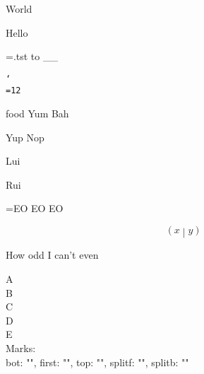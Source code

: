 \documentclass{article}
\begin{document}
\protected{}
\def\bar{World}
\edef\sayit{\foo\bar}
\def\foo{Dumm}
\def\bar{gelaufen}
\sayit

\detokenize{\hola}

\def\foo{Hello}
\def\bar{World}
\edef\sayit{\foo\unexpanded{\bar}}
\def\foo{Dumm}
\def\bar{gelaufen}
\sayit

\newread\file
\openin\file=\jobname.tst
\loop\unless\ifeof\file
    \readline\file to\fileline
    \_\fileline\_
\repeat
\closein\file

\def\test#1{\begingroup\tt\catcode`\\=12
    \scantokens{#1}\endgroup}
\test{\abc\def}

\the\eTeXversion\eTeXrevision

\the\currentgrouplevel
{\the\currentgrouplevel}
{{\the\currentgrouplevel}}
{{{\the\currentgrouplevel}}}
{{\begingroup{\the\currentgrouplevel}\endgroup}}
\begin{minipage}{1cm}
    {
        {
            \begingroup
                {
                    \the\currentgrouplevel
                }
            \endgroup
        }
    }
\end{minipage}

\the\currentgrouptype
{\the\currentgrouptype}
\begingroup\the\currentgrouptype\endgroup
\begin{minipage}{1cm}\the\currentgrouptype\end{minipage}

\def\food{beef}
\ifcsname food\endcsname
Yum
\else
Bah
\fi

\ifdefined\blablabla
Yup
\else
Nop
\fi

\the\lastnodetype


\the\TeXXeTstate
\the\predisplaydirection

{}
\beginL
Lui
\endL
{}

{}
\beginR
Rui
\endR
{}

\the\interactionmode
\the\tracingassigns
\the\tracinggroups
\the\tracingifs
\the\tracingscantokens 

\everyeof={EO EO EO}

\[
\left( x \middle\vert y \right)
\]

\def\zahl{3}
\unless\ifodd\zahl
How odd
\else
I can't even
\fi

\newpage

\noindent
A\\
B\\
\newpage
\noindent
C\\
D\\
E\\
Marks:\\
bot: "", first: "", top: "", splitf: "", splitb: ""
\end{document}
